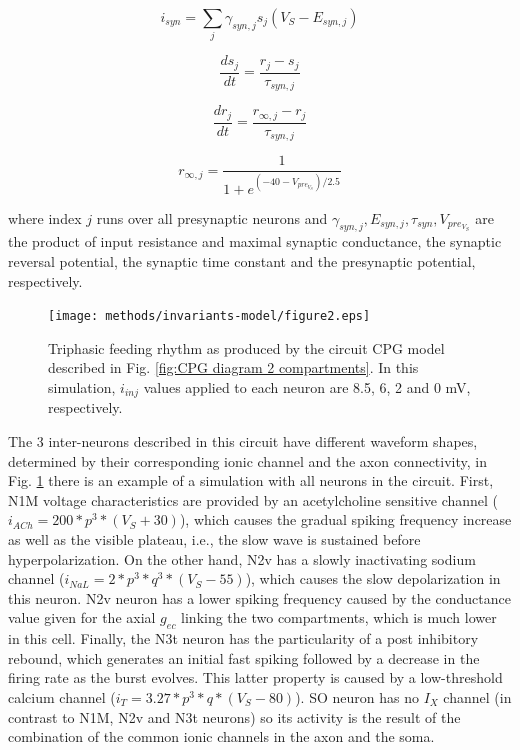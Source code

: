 \begin{equation}
	i_{syn} = \sum_j \gamma_{syn,j} s_j (V_S - E_{syn,j})
	\label{eq:syn1}
\end{equation}

\begin{equation}
	\frac{ds_j}{dt} = \frac{r_{j}-s_j}{\tau_{syn,j}}
\end{equation}

\begin{equation}
	\frac{dr_j}{dt} = \frac{r_{\infty,j}-r_j}{\tau_{syn,j}}
\end{equation}

\begin{equation}
	r_{\infty,j}=\frac{1}{1+e^{(-40-V_{pre_{V_S}})/2.5}}
	\label{eq:syn2}
\end{equation}


\noindent where index $j$ runs over all presynaptic neurons and \(\gamma_{syn,j}, E_{syn,j},\tau_{syn},V_{pre_{V_S}}\) are the product of input resistance and maximal synaptic conductance, the synaptic reversal potential, the synaptic time constant and the presynaptic potential, respectively. 


\begin{figure}[h!]
	\centering
	\texttt{[image: methods/invariants-model/figure2.eps]}
	\caption{Triphasic feeding rhythm as produced by the circuit CPG model described in Fig. \ref{fig:CPG diagram 2 compartments}. In this simulation, $i_{inj}$ values applied to each neuron are 8.5, 6, 2 and 0 mV, respectively.}
	\label{fig:model simulation}
\end{figure}

The 3 inter-neurons described in this circuit have different waveform shapes, determined by their corresponding ionic channel and the axon connectivity, in Fig. \ref{fig:model simulation}   there is an example of a simulation with all neurons in the circuit. First, N1M voltage characteristics are provided by an acetylcholine sensitive channel (\(i_{ACh} = 200 * p^3 * (V_S + 30)\)), which causes the gradual spiking frequency increase as well as the visible plateau, i.e., the slow wave is sustained before hyperpolarization. On the other hand, N2v has a slowly inactivating sodium channel (\(i_{NaL} = 2 * p^3 * q^3 * (V_S-55)\)), which causes the slow depolarization in this neuron. N2v neuron has a lower spiking frequency caused by the conductance value given for the axial $g_{ec}$ linking the two compartments, which is much lower in this cell. Finally, the N3t neuron has the particularity of a post inhibitory rebound, which generates an initial fast spiking followed by a decrease in the firing rate as the burst evolves. This latter property is caused by a low-threshold calcium channel (\( i_T = 3.27 * p^3 * q *(V_S-80)\)). SO neuron has no \(I_X\) channel (in contrast to N1M, N2v and N3t neurons) so its activity is the result of the combination of the common ionic channels in the axon and the soma.

